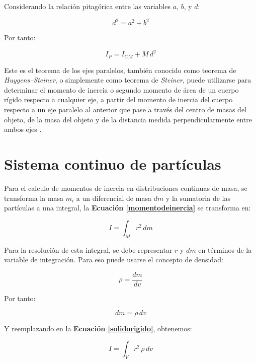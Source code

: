 \documentclass[letter,oneside,11pt]{article}
\begin{document}
Considerando la relación pitagórica entre las variables $a$, $b$, y $d$:

\begin{equation*}
    d^2 = a^2 + b^2
\end{equation*}

Por tanto:

\begin{equation}
    I_{P} = I_{CM} + M\, d^2
\end{equation}

Este es el teorema de los ejes paralelos, también conocido como teorema de 
\emph{Huygens–Steiner}, o simplemente como teorema de \emph{Steiner}, puede
utilizarse para determinar el momento de inercia o segundo momento de área de
un cuerpo rígido respecto a cualquier eje, a partir del momento de inercia del
cuerpo respecto a un eje paralelo al anterior que pase a través del centro de
masas del objeto, de la masa del objeto y de la distancia medida
perpendicularmente entre ambos ejes \cite{WIKI1}.

\section{Sistema continuo de partículas \cite{Sears}}

Para el calculo de momentos de inercia en distribuciones continuas de masa, se
transforma la masa $m_i$ a un diferencial de masa $dm$ y la sumatoria de las
partículas a una integral, la \textbf{Ecuación \ref{momentodeinercia}} se
transforma en:

\begin{equation}
    I = \int_{M} r^2\, dm
\label{solidorigido}
\end{equation}

Para la resolución de esta integral, se debe representar $r$ y $dm$ en términos
de la variable de integración. Para eso puede usarse el concepto de densidad:

\begin{equation}
    \rho = \frac{dm}{dv}
\label{densidad}
\end{equation}

Por tanto:

\begin{equation*}
    dm = \rho\, dv
\end{equation*}

Y reemplazando en la \textbf{Ecuación \ref{solidorigido}}, obtenemos:

\begin{equation*}
    I = \int_{V} r^2\, \rho\, dv
\end{equation*}
\end{document}

